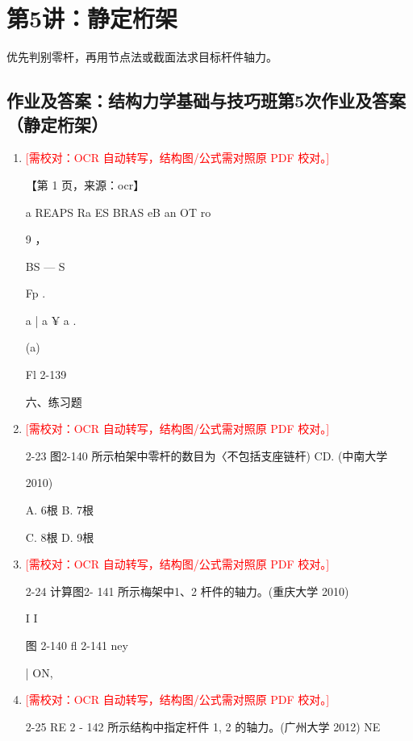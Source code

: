 \documentclass[UTF8,12pt,a4paper,openany]{ctexbook}
\newcommand{\TODO}[1]{\textcolor{red}{[需校对：#1]}}
\begin{document}
\chapter{第5讲：静定桁架}
\begin{tcolorbox}[title=解析总览]
优先判别零杆，再用节点法或截面法求目标杆件轴力。
\end{tcolorbox}
\section{作业及答案：结构力学基础与技巧班第5次作业及答案（静定桁架）}
\begin{enumerate}[label=\textbf{\arabic*.},leftmargin=2em]
\item \TODO{OCR 自动转写，结构图/公式需对照原 PDF 校对。}\par 【第 1 页，来源：ocr】\par a REAPS Ra ES BRAS eB an OT ro\par 9   ，\par BS —   S\par Fp       .\par a   |  a ¥  a                                                 .\par (a)\par Fl 2-139\par 六、练习题
\item \TODO{OCR 自动转写，结构图/公式需对照原 PDF 校对。}\par 2-23 图2-140 所示柏架中零杆的数目为〈不包括支座链杆) CD. (中南大学\par 2010)\par A. 6根                      B. 7根\par C. 8根                      D. 9根
\item \TODO{OCR 自动转写，结构图/公式需对照原 PDF 校对。}\par 2-24 计算图2- 141 所示梅架中1、2 杆件的轴力。(重庆大学 2010)\par I   I\par 图 2-140               fl 2-141                 ney\par |                                                       ON,
\item \TODO{OCR 自动转写，结构图/公式需对照原 PDF 校对。}\par 2-25 RE 2 - 142 所示结构中指定杆件 1, 2 的轴力。(广州大学 2012)       NE

\end{enumerate}
\end{document}

